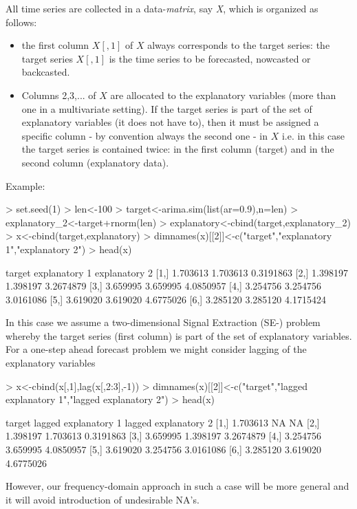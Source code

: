 \documentclass[a4paper]{book}
\begin{document}
All time series are collected in a data-\emph{matrix}, say \emph{X}, which is organized as follows: 
\begin{itemize}
\item the first column $X[,1]$ of $X$ always corresponds to the target series: the target series $X[,1]$ is the time series to be forecasted, nowcasted or backcasted.
\item Columns 2,3,... of $X$ are allocated to the explanatory variables (more than one in a multivariate setting). If the target series is part of the set of explanatory variables (it does not have to), then it must be assigned a specific column - by convention always the second one - in $X$ i.e. in this case the target series is contained twice: in the first column (target) and in the second column (explanatory data).     
\end{itemize}
Example:
\begin{Schunk}
\begin{Sinput}
> set.seed(1)
> len<-100
> target<-arima.sim(list(ar=0.9),n=len)
> explanatory_2<-target+rnorm(len)
> explanatory<-cbind(target,explanatory_2)
> x<-cbind(target,explanatory)
> dimnames(x)[[2]]<-c("target","explanatory 1","explanatory 2")
> head(x)
\end{Sinput}
\begin{Soutput}
       target explanatory 1 explanatory 2
[1,] 1.703613      1.703613     0.3191863
[2,] 1.398197      1.398197     3.2674879
[3,] 3.659995      3.659995     4.0850957
[4,] 3.254756      3.254756     3.0161086
[5,] 3.619020      3.619020     4.6775026
[6,] 3.285120      3.285120     4.1715424
\end{Soutput}
\end{Schunk}
In this case we assume a two-dimensional Signal Extraction (SE-) problem whereby the target series (first column) is part of the set of explanatory variables. For a one-step ahead forecast problem we might consider lagging of the explanatory variables
\begin{Schunk}
\begin{Sinput}
> x<-cbind(x[,1],lag(x[,2:3],-1))
> dimnames(x)[[2]]<-c("target","lagged explanatory 1","lagged explanatory 2")
> head(x)
\end{Sinput}
\begin{Soutput}
       target lagged explanatory 1 lagged explanatory 2
[1,] 1.703613                   NA                   NA
[2,] 1.398197             1.703613            0.3191863
[3,] 3.659995             1.398197            3.2674879
[4,] 3.254756             3.659995            4.0850957
[5,] 3.619020             3.254756            3.0161086
[6,] 3.285120             3.619020            4.6775026
\end{Soutput}
\end{Schunk}
However, our frequency-domain approach in such a case will be more general and it will avoid introduction of undesirable NA's.
\end{document}
